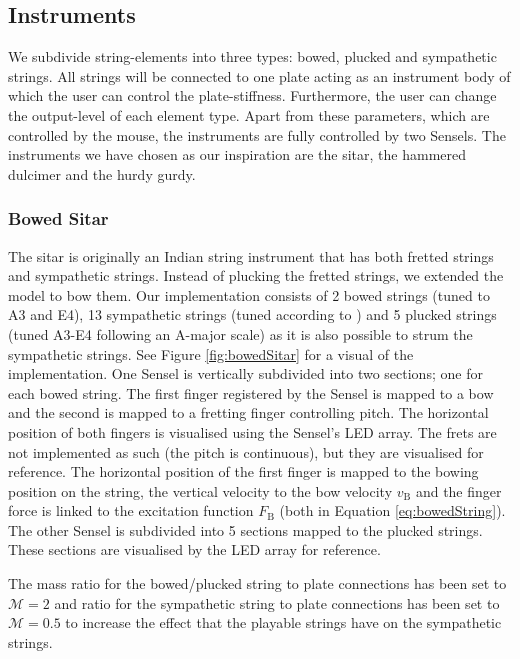 \subsection{Instruments}
We subdivide string-elements into three types: bowed, plucked and sympathetic strings. All strings will be connected to one plate acting as an instrument body of which the user can control the plate-stiffness. Furthermore, the user can change the output-level of each element type. Apart from these parameters, which are controlled by the mouse, the instruments are fully controlled by two Sensels. The instruments we have chosen as our inspiration are the sitar, the hammered dulcimer and the hurdy gurdy.

\subsubsection{Bowed Sitar}
The sitar is originally an Indian string instrument that has both fretted strings and sympathetic strings. Instead of plucking the fretted strings, we extended the model to bow them. Our implementation consists of 2 bowed strings (tuned to A3 and E4), 13 sympathetic strings (tuned according to \cite{sitarTuning}) and 5 plucked strings (tuned A3-E4 following an A-major scale) as it is also possible to strum the sympathetic strings. See Figure \ref{fig:bowedSitar} for a visual of the implementation. One Sensel is vertically subdivided into two sections; one for each bowed string. The first finger registered by the Sensel is mapped to a bow and the second is mapped to a fretting finger controlling pitch. The horizontal position of both fingers is visualised using the Sensel's LED array. The frets are not implemented as such (the pitch is continuous), but they are visualised for reference. The horizontal position of the first finger is mapped to the bowing position on the string, the vertical velocity to the bow velocity $v_\text{B}$ and the finger force is linked to the excitation function $F_\text{B}$ (both in Equation \eqref{eq:bowedString}). The other Sensel is subdivided into 5 sections mapped to the plucked strings. These sections are visualised by the LED array for reference.

The mass ratio for the bowed/plucked string to plate connections has been set to $\mathcal{M} = 2$ and ratio for the sympathetic string to plate connections has been set to $\mathcal{M} = 0.5$ to increase the effect that the playable strings have on the sympathetic strings.

